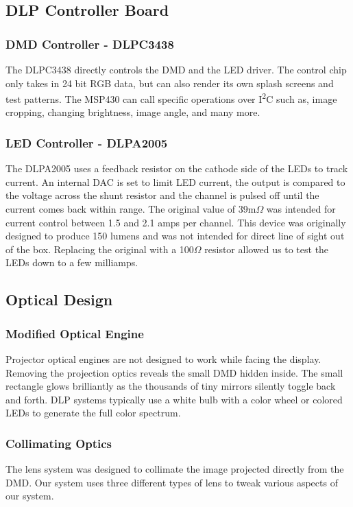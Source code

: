 \documentclass[12pt,a4paper]{article}
\begin{document}
\subsection{DLP Controller Board}

\subsubsection{DMD Controller - DLPC3438}
The DLPC3438 directly controls the DMD and the LED driver. The control chip only takes in 24 bit RGB data, but can also render its own splash screens and test patterns. The MSP430 can call specific operations over I\textsuperscript{2}C such as, image cropping, changing brightness, image angle, and many more. 

\subsubsection{LED Controller - DLPA2005}
The DLPA2005 uses a feedback resistor on the cathode side of the LEDs to track current. An internal DAC is set to limit LED current, the output is compared to the voltage across the shunt resistor and the channel is pulsed off until the current comes back within range. The original value of 39m$\Omega$ was intended for current control between 1.5 and 2.1 amps per channel. This device was originally designed to produce 150 lumens and was not intended for direct line of sight out of the box. Replacing the original with a 100$\Omega$ resistor allowed us to test the LEDs down to a few milliamps. 

\subsection{Optical Design}
\subsubsection{Modified Optical Engine}
Projector optical engines are not designed to work while facing the display. Removing the projection optics reveals the small DMD hidden inside. The small rectangle glows brilliantly as the thousands of tiny mirrors silently toggle back and forth. DLP systems typically use a white bulb with a color wheel or colored LEDs to generate the full color spectrum. 

\subsubsection{Collimating Optics}
The lens system was designed to collimate the image projected directly from the DMD. Our system uses three different types of lens to tweak various aspects of our system.
\end{document}
